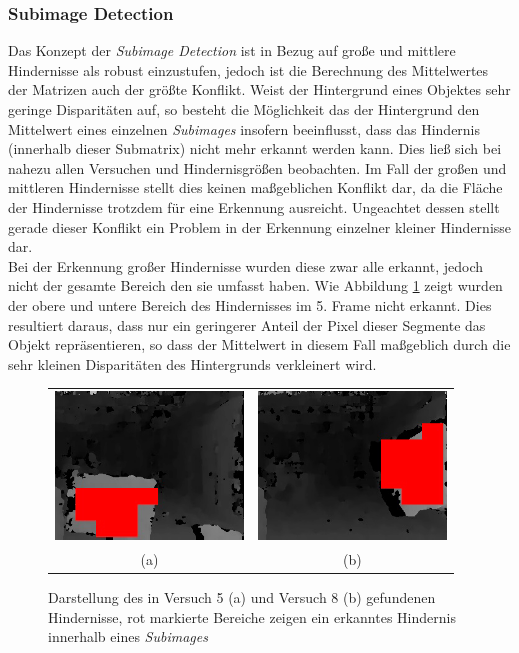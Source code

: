 \subsubsection{Subimage Detection}
\noindent
Das Konzept der \emph{Subimage Detection} ist in Bezug auf große und mittlere Hindernisse als robust einzustufen, jedoch ist die Berechnung des Mittelwertes der Matrizen auch der größte Konflikt. Weist der Hintergrund eines Objektes sehr geringe Disparitäten auf, so besteht die Möglichkeit das der Hintergrund den Mittelwert eines einzelnen \emph{Subimages} insofern beeinflusst, dass das Hindernis (innerhalb dieser Submatrix) nicht mehr erkannt werden kann. Dies ließ sich bei nahezu allen Versuchen und Hindernisgrößen beobachten. Im Fall der großen und mittleren Hindernisse stellt dies keinen maßgeblichen Konflikt dar, da die Fläche der Hindernisse trotzdem für eine Erkennung ausreicht. Ungeachtet dessen stellt gerade dieser Konflikt ein Problem in der Erkennung einzelner kleiner Hindernisse dar.\\

\noindent
Bei der Erkennung großer Hindernisse wurden diese zwar alle erkannt, jedoch nicht der gesamte Bereich den sie umfasst haben. Wie Abbildung \ref{fig:eval_big_fails} zeigt wurden der obere und untere Bereich des Hindernisses im 5. Frame nicht erkannt. Dies resultiert daraus, dass nur ein geringerer Anteil der Pixel dieser Segmente das Objekt repräsentieren, so dass der Mittelwert in diesem Fall maßgeblich durch die sehr kleinen Disparitäten des Hintergrunds verkleinert wird.\\

\begin{figure}[h]
	\centering
	\begin{tabular}{cc}
	\includegraphics[width=5cm]{img/evaluation/_test_5_disparity}&
	\includegraphics[width=5cm]{img/evaluation/_test_8_disparity}\\
	(a) &  (b)
	\end{tabular}
	\caption{Darstellung des in Versuch 5 (a) und Versuch 8 (b) gefundenen Hindernisse, rot markierte Bereiche zeigen ein erkanntes Hindernis innerhalb eines \emph{Subimages} }
    \label{fig:eval_big_fails}
\end{figure}

